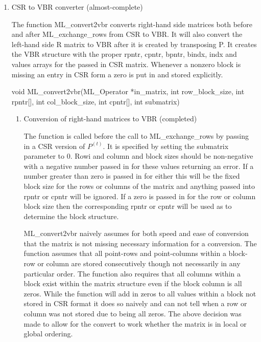 \documentclass[10pt,letter,relax]{SANDreport}
\begin{document}
\begin{enumerate}
\begin{enumerate}
\begin{enumerate}
\end{enumerate}



\end{enumerate}

  \item  CSR to VBR converter (almost-complete)

    The function ML\_convert2vbr converts right-hand side matrices both before and after ML\_exchange\_rows from CSR to VBR.
It will also convert the left-hand side R matrix to VBR after it is created by transposing P.
It creates the VBR structure with the proper rpntr, cpntr, bpntr, bindx, indx and values arrays for the passed in CSR matrix.
Whenever a nonzero block is missing an entry in CSR form a zero is put in and stored explicitly.


void ML\_convert2vbr(ML\_Operator *in\_matrix, int row\_block\_size, int rpntr[], int col\_block\_size, int cpntr[], int submatrix)

    \begin{enumerate}
      \item  Conversion of right-hand matrices to VBR (completed)

      The function is called before the call to ML\_exchange\_rows by passing
in a CSR version of $P^{(t)}$.  It is specified by setting the submatrix parameter to 0.
Rowi and column and block sizes should be non-negative with a negative number passed in for these values returning an error.
 If a number greater than zero is passed in for either this will be the fixed block size for the rows or columns of the matrix and anything passed into rpntr or cpntr will be ignored.  
If a zero is passed in for the row or column block size then the corresponding rpntr or cpntr will be used as to determine the block structure.

ML\_convert2vbr naively assumes for both speed and ease of conversion that the matrix is not missing necessary information for a conversion.
The function assumes that all point-rows and point-columns within a block-row or column are stored consecutively though not necessarily in any particular order.
The function also requires that all columns within a block exist within the matrix structure even if the block column is all zeros.
While the function will add in zeros to all values within a block not stored in CSR format it does so naively and can not tell when a row or column was not stored due to being all zeros.
The above decision was made to allow for the convert to work whether the matrix is in local or global ordering.


\end{enumerate}
\end{enumerate}
\end{document}
